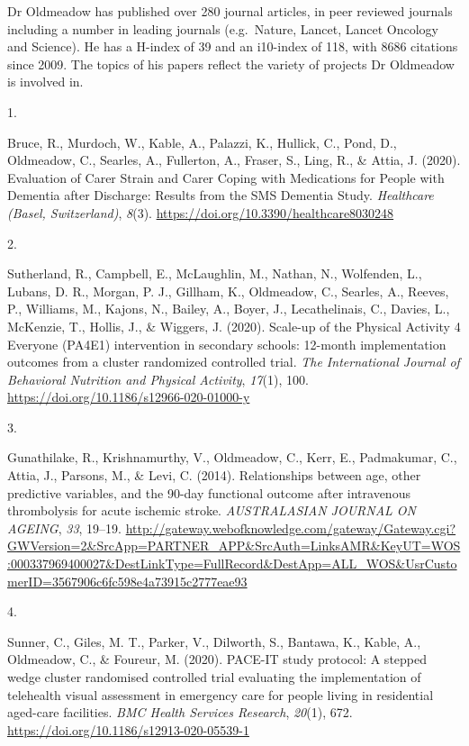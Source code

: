 \documentclass[11pt, a4paper]{awesome-cv}
\newlength{\csllabelwidth}
\newcommand{\CSLLeftMargin}[1]{\parbox[t]{\csllabelwidth}{#1}}
\newcommand{\CSLRightInline}[1]{\parbox[t]{\linewidth - \csllabelwidth}{#1}}
\begin{document}
Dr Oldmeadow has published over 280 journal articles, in peer reviewed
journals including a number in leading journals (e.g.~Nature, Lancet,
Lancet Oncology and Science). He has a H-index of 39 and an i10-index of
118, with 8686 citations since 2009. The topics of his papers reflect
the variety of projects Dr Oldmeadow is involved in.

\hypertarget{bibliography}{}
\leavevmode\hypertarget{ref-bruce_evaluation_2020}{}%
\CSLLeftMargin{1. }
\CSLRightInline{Bruce, R., Murdoch, W., Kable, A., Palazzi, K., Hullick,
C., Pond, D., Oldmeadow, C., Searles, A., Fullerton, A., Fraser, S.,
Ling, R., \& Attia, J. (2020). Evaluation of Carer Strain and Carer
Coping with Medications for People with Dementia after Discharge:
Results from the SMS Dementia Study. \emph{Healthcare (Basel,
Switzerland)}, \emph{8}(3).
\url{https://doi.org/10.3390/healthcare8030248}}

\leavevmode\hypertarget{ref-sutherland_scale-up_2020}{}%
\CSLLeftMargin{2. }
\CSLRightInline{Sutherland, R., Campbell, E., McLaughlin, M., Nathan,
N., Wolfenden, L., Lubans, D. R., Morgan, P. J., Gillham, K., Oldmeadow,
C., Searles, A., Reeves, P., Williams, M., Kajons, N., Bailey, A.,
Boyer, J., Lecathelinais, C., Davies, L., McKenzie, T., Hollis, J., \&
Wiggers, J. (2020). Scale-up of the Physical Activity 4 Everyone (PA4E1)
intervention in secondary schools: 12-month implementation outcomes from
a cluster randomized controlled trial. \emph{The International Journal
of Behavioral Nutrition and Physical Activity}, \emph{17}(1), 100.
\url{https://doi.org/10.1186/s12966-020-01000-y}}

\leavevmode\hypertarget{ref-gunathilake_relationships_2014}{}%
\CSLLeftMargin{3. }
\CSLRightInline{Gunathilake, R., Krishnamurthy, V., Oldmeadow, C., Kerr,
E., Padmakumar, C., Attia, J., Parsons, M., \& Levi, C. (2014).
Relationships between age, other predictive variables, and the 90-day
functional outcome after intravenous thrombolysis for acute ischemic
stroke. \emph{AUSTRALASIAN JOURNAL ON AGEING}, \emph{33}, 19--19.
\url{http://gateway.webofknowledge.com/gateway/Gateway.cgi?GWVersion=2\&SrcApp=PARTNER_APP\&SrcAuth=LinksAMR\&KeyUT=WOS:000337969400027\&DestLinkType=FullRecord\&DestApp=ALL_WOS\&UsrCustomerID=3567906c6fc598e4a73915c2777eae93}}

\leavevmode\hypertarget{ref-sunner_pace-it_2020}{}%
\CSLLeftMargin{4. }
\CSLRightInline{Sunner, C., Giles, M. T., Parker, V., Dilworth, S.,
Bantawa, K., Kable, A., Oldmeadow, C., \& Foureur, M. (2020). PACE-IT
study protocol: A stepped wedge cluster randomised controlled trial
evaluating the implementation of telehealth visual assessment in
emergency care for people living in residential aged-care facilities.
\emph{BMC Health Services Research}, \emph{20}(1), 672.
\url{https://doi.org/10.1186/s12913-020-05539-1}}
\end{document}
